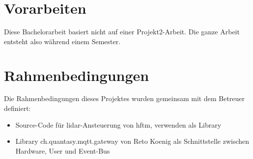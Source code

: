 \section{Vorarbeiten}
Diese Bachelorarbeit basiert nicht auf einer Projekt2-Arbeit. Die ganze Arbeit entsteht also während einem Semester.

\section{Rahmenbedingungen}
Die Rahmenbedingungen dieses Projektes wurden gemeinsam mit dem Betreuer definiert:
\begin{itemize}
\item Source-Code für \acrshort{lidar}-Ansteuerung von \acrshort{hftm}, verwenden als Library
\item Library ch.quantasy.mqtt.gateway\cite{ch.quantasy.mqtt.gateway} von Reto Koenig als Schnittstelle zwischen Hardware, User und Event-Bus
\end{itemize}
